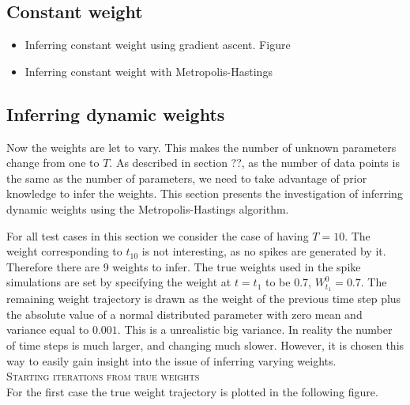 
\subsection{Constant weight}

\begin{itemize}
    \item Inferring constant weight using gradient ascent. Figure
    \item Inferring constant weight with Metropolis-Hastings
\end{itemize}

\subsection{Inferring dynamic weights}
Now the weights are let to vary. This makes the number of unknown parameters change from one to $T$. As described in section ??, as the number of data points is the same as the number of parameters, we need to take advantage of prior knowledge to infer the weights. This section presents the investigation of inferring dynamic weights using the Metropolis-Hastings algorithm.

For all test cases in this section we consider the case of having $T=10$. The weight corresponding to $t_{10}$ is not interesting, as no spikes are generated by it. Therefore there are 9 weights to infer. The true weights used in the spike simulations are set by specifying the weight at $t=t_1$ to be 0.7, $W_{t_1}^0 = 0.7$. The remaining weight trajectory is drawn as the weight of the previous time step plus the absolute value of a normal distributed parameter with zero mean and variance equal to $0.001$. This is a unrealistic big variance. In reality the number of time steps is much larger, and changing much slower. However, it is chosen this way to easily gain insight into the issue of inferring varying weights. \\

\textsc{Starting iterations from true weights}\\
For the first case the true weight trajectory is plotted in the following figure. 


